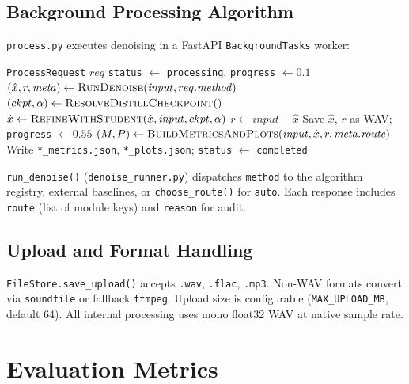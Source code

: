 \subsection{Background Processing Algorithm}

\texttt{process.py} executes denoising in a FastAPI \texttt{BackgroundTasks} worker:

\begin{algorithm}[H]
  \caption{Web processing pipeline (\texttt{\_do\_process})}
  \label{alg:web_process}
  \begin{algorithmic}[1]
    \Require \texttt{ProcessRequest} $req$
    \State \texttt{status} $\gets$ \texttt{processing}, \texttt{progress} $\gets 0.1$
    \State $(\hat{x}, r, \mathit{meta}) \gets \textsc{RunDenoise}(\mathit{input}, req.\mathit{method})$
      \State $(ckpt, \alpha) \gets \textsc{ResolveDistillCheckpoint}()$ 
      \State $\hat{x} \gets \textsc{RefineWithStudent}(\hat{x}, \mathit{input}, ckpt, \alpha)$
      \State $r \gets \mathit{input} - \hat{x}$
    \EndIf
    \State Save $\hat{x}$, $r$ as WAV; \texttt{progress} $\gets 0.55$
    \State $(M, P) \gets \textsc{BuildMetricsAndPlots}(\mathit{input}, \hat{x}, r, \mathit{meta.route})$
    \State Write \texttt{*\_metrics.json}, \texttt{*\_plots.json}; \texttt{status} $\gets$ \texttt{completed}
  \end{algorithmic}
\end{algorithm}

\texttt{run\_denoise()} (\texttt{denoise\_runner.py}) dispatches \texttt{method} to the algorithm registry, external baselines, or \texttt{choose\_route()} for \texttt{auto}. Each response includes \texttt{route} (list of module keys) and \texttt{reason} for audit.

\subsection{Upload and Format Handling}

\texttt{FileStore.save\_upload()} accepts \texttt{.wav}, \texttt{.flac}, \texttt{.mp3}. Non-WAV formats convert via \texttt{soundfile} or fallback \texttt{ffmpeg}. Upload size is configurable (\texttt{MAX\_UPLOAD\_MB}, default 64). All internal processing uses mono float32 WAV at native sample rate.

\section{Evaluation Metrics}
\label{sec:metrics}

